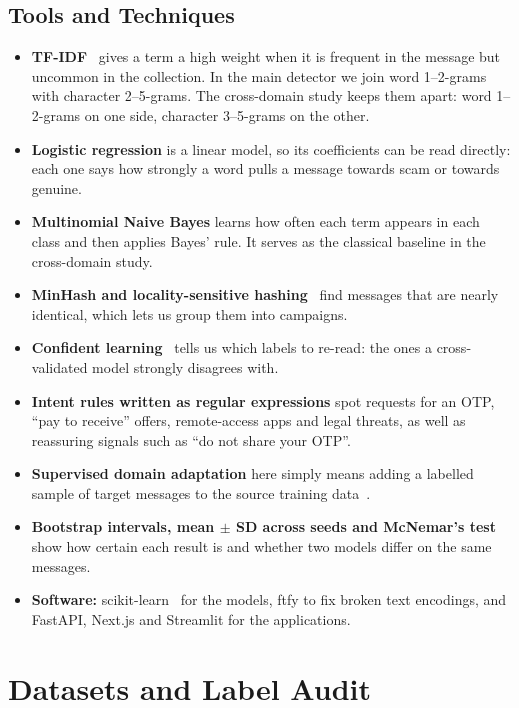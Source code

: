 \label{sec:tools}
\subsection{Tools and Techniques}
\begin{itemize}
\item \textbf{TF-IDF}~\cite{salton1988term} gives a term a high weight when it is frequent in the message but uncommon in the collection. In the main detector we join word 1--2-grams with character 2--5-grams. The cross-domain study keeps them apart: word 1--2-grams on one side, character 3--5-grams on the other.
\item \textbf{Logistic regression} is a linear model, so its coefficients can be read directly: each one says how strongly a word pulls a message towards scam or towards genuine.
\item \textbf{Multinomial Naive Bayes} learns how often each term appears in each class and then applies Bayes' rule. It serves as the classical baseline in the cross-domain study.
\item \textbf{MinHash and locality-sensitive hashing}~\cite{broder1997resemblance} find messages that are nearly identical, which lets us group them into campaigns.
\item \textbf{Confident learning}~\cite{northcutt2021confident} tells us which labels to re-read: the ones a cross-validated model strongly disagrees with.
\item \textbf{Intent rules written as regular expressions} spot requests for an OTP, ``pay to receive'' offers, remote-access apps and legal threats, as well as reassuring signals such as ``do not share your OTP''.
\item \textbf{Supervised domain adaptation} here simply means adding a labelled sample of target messages to the source training data~\cite{daume2007frustratingly,pan2010survey}.
\item \textbf{Bootstrap intervals, mean $\pm$ SD across seeds and McNemar's test}~\cite{mcnemar1947note,dietterich1998approximate} show how certain each result is and whether two models differ on the same messages.
\item \textbf{Software:} scikit-learn~\cite{pedregosa2011scikit} for the models, ftfy to fix broken text encodings, and FastAPI, Next.js and Streamlit for the applications.
\end{itemize}

\section{Datasets and Label Audit}\label{sec:data}

